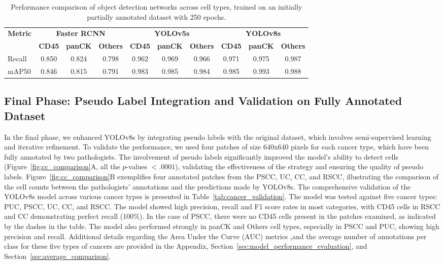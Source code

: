 \documentclass{midl} %
\begin{document}
\begin{table}[!htbp]
\centering
\caption{Performance comparison of object detection networks across cell types, trained on an initially partially annotated dataset with 250 epochs.}%
  \begin{tabular}{l|ccc|ccc|ccc}
  \toprule
  \bfseries Metric & \multicolumn{3}{c|}{\bfseries Faster RCNN} & \multicolumn{3}{c|}{\bfseries YOLOv5s} & \multicolumn{3}{c}{\bfseries YOLOv8s}\\
  & {\small \bfseries CD45} & {\small \bfseries panCK} & {\small \bfseries Others} & {\small \bfseries CD45} & {\small \bfseries panCK} & {\small \bfseries Others} & {\small \bfseries CD45} & {\small \bfseries panCK} & {\small \bfseries Others}\\
  Recall & 0.850 & 0.824 & 0.798 & 0.962 & 0.969 & 0.966 & 0.971 & 0.975 & 0.987\\
  mAP50 & 0.846 & 0.815 & 0.791 & 0.983 & 0.985 & 0.984 & 0.985 & 0.993 & 0.988 \\
  \bottomrule
  \end{tabular}
\label{tab:comparison_results}%
\end{table}

\subsection{Final Phase: Pseudo Label Integration and Validation on Fully Annotated Dataset}
In the final phase, we enhanced YOLOv8s by integrating pseudo labels with the original dataset, which involves semi-supervised learning and iterative refinement. To validate the performance, we used four patches of size 640x640 pixels for each cancer type, which have been fully annotated by two pathologists. The involvement of pseudo labels  significantly improved the model's ability to detect cells (Figure~\ref{fig:cc_comparison}A, all the \(p\)-values \(< .0001\)), validating the effectiveness of the strategy and ensuring the quality of pseudo labels. Figure~\ref{fig:cc_comparison}B exemplifies four annotated patches from the PSCC, UC, CC, and RSCC, illustrating the comparison of the cell counts between the pathologists' annotations and the predictions made by YOLOv8s.
The comprehensive validation of the YOLOv8s model across various cancer types is presented in Table~\ref{tab:cancer_validation}. The model was tested against five cancer types: PUC, PSCC, UC, CC, and RSCC. The model showed high precision, recall and F1 score rates in most categories, with CD45 cells in RSCC and CC demonstrating perfect recall (100\%). In the case of PSCC, there were no CD45 cells present in the patches examined, as indicated by the dashes in the table. The model also performed strongly in panCK and Others cell types, especially in PSCC and PUC, showing high precision and recall. Additional details regarding the Area Under the Curve (AUC) metrics ,and the average number of annotations per class for these five types of cancers are provided in the Appendix, Section~\ref{sec:model_performance_evaluation}, and Section~\ref{sec:average_comparison}.
\end{document}
